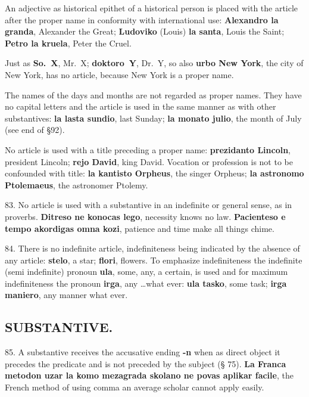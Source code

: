 An adjective as historical epithet of a historical person is placed with the article after the proper name in conformity with international use: \textbf{Alexandro la granda}, Alexander the Great; \textbf{Ludoviko} (Louis) \textbf{la santa}, Louis the Saint; \textbf{Petro la kruela}, Peter the Cruel. 

Just as \textbf{So.~X}, Mr.~X; \textbf{doktoro~Y}, Dr.~Y, so also \textbf{urbo New York}, the city of New York, has no article, because New York is a proper name. 

The names of the days and months are not regarded as proper names. They have no capital letters and the article is used in the same manner as with other substantives: \textbf{la lasta sundio}, last Sunday; \textbf{la monato julio}, the month of July (see end of §92). 

No article is used with a title preceding a proper name: \textbf{prezidanto Lincoln}, president Lincoln; \textbf{rejo David}, king David. Vocation or profession is not to be confounded with title: \textbf{la kantisto Orpheus}, the singer Orpheus; \textbf{la astronomo Ptolemaeus}, the astronomer Ptolemy. 

83. No article is used with a substantive in an indefinite or general sense, as in proverbs. \textbf{Ditreso ne konocas lego}, necessity knows no law. \textbf{Pacienteso e tempo akordigas omna kozi}, patience and time make all things chime. 

84. There is no indefinite article, indefiniteness being indicated by the absence of any article: \textbf{stelo}, a star; \textbf{flori}, flowers. To emphasize indefiniteness the indefinite (semi indefinite) pronoun \textbf{ula}, some, any, a certain, is used and for maximum indefiniteness the pronoun \textbf{irga}, any \ldots what ever: \textbf{ula tasko}, some task; \textbf{irga maniero}, any manner what ever.

\subsection*{SUBSTANTIVE.}
85. A substantive receives the accusative ending \textbf{-n} when as direct object it precedes the predicate and is not preceded by the subject (§ 75). \textbf{La Franca metodon uzar la komo mezagrada skolano ne povas aplikar facile}, the French method of using comma an average scholar cannot apply easily. 

